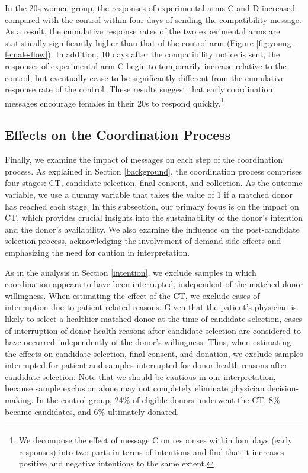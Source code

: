 \documentclass[12pt, a4paper]{article}
\begin{document}
In the 20s women group, the responses of experimental arms C and D increased compared with the control within four days of sending the compatibility message. As a result, the cumulative response rates of the two experimental arms are statistically significantly higher than that of the control arm (Figure \ref{fig:young-female-flow}). In addition, 10 days after the compatibility notice is sent, the responses of experimental arm C begin to temporarily increase relative to the control, but eventually cease to be significantly different from the cumulative response rate of the control. These results suggest that early coordination messages encourage females in their 20s to respond quickly.\footnote{We decompose the effect of message C on responses within four days (early responses) into two parts in terms of intentions and find that it increases positive and negative intentions to the same extent.}

\hypertarget{process}{%
\subsection{Effects on the Coordination Process}\label{process}}

Finally, we examine the impact of messages on each step of the coordination process. As explained in Section \ref{background}, the coordination process comprises four stages: CT, candidate selection, final consent, and collection. As the outcome variable, we use a dummy variable that takes the value of 1 if a matched donor has reached each stage. In this subsection, our primary focus is on the impact on CT, which provides crucial insights into the sustainability of the donor's intention and the donor's availability. We also examine the influence on the post-candidate selection process, acknowledging the involvement of demand-side effects and emphasizing the need for caution in interpretation.

As in the analysis in Section \ref{intention}, we exclude samples in which coordination appears to have been interrupted, independent of the matched donor willingness. When estimating the effect of the CT, we exclude cases of interruption due to patient-related reasons. Given that the patient's physician is likely to select a healthier matched donor at the time of candidate selection, cases of interruption of donor health reasons after candidate selection are considered to have occurred independently of the donor's willingness. Thus, when estimating the effects on candidate selection, final consent, and donation, we exclude samples interrupted for patient and samples interrupted for donor health reasons after candidate selection. Note that we should be cautious in our interpretation, because sample exclusion alone may not completely eliminate physician decision-making. In the control group, 24\% of eligible donors underwent the CT, 8\% became candidates, and 6\% ultimately donated.
\end{document}
